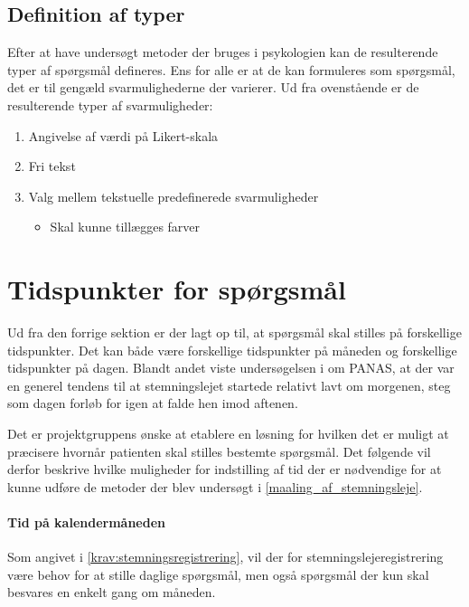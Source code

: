 \subsection{Definition af typer}\label{krav::typer}
Efter at have undersøgt metoder der bruges i psykologien kan de resulterende typer af spørgsmål defineres.
Ens for alle er at de kan formuleres som spørgsmål, det er til gengæld svarmulighederne der varierer.
Ud fra ovenstående er de resulterende typer af svarmuligheder:

\begin{enumerate}
\item Angivelse af værdi på Likert-skala
\item Fri tekst
\item Valg mellem tekstuelle predefinerede svarmuligheder
\begin{itemize}
	\item Skal kunne tillægges farver
\end{itemize}
\end{enumerate}

\section{Tidspunkter for spørgsmål}\label{tidspnkforspg}
Ud fra den forrige sektion er der lagt op til, at spørgsmål skal stilles på forskellige tidspunkter.
Det kan både være forskellige tidspunkter på måneden og forskellige tidspunkter på dagen.
Blandt andet viste undersøgelsen i \citet{panas} om PANAS, at der var en generel tendens til at stemningslejet startede relativt lavt om morgenen, steg som dagen forløb for igen at falde hen imod aftenen.

Det er projektgruppens ønske at etablere en løsning for hvilken det er muligt at præcisere hvornår patienten skal stilles bestemte spørgsmål.
Det følgende vil derfor beskrive hvilke muligheder for indstilling af tid der er nødvendige for at kunne udføre de metoder der blev undersøgt i \cref{maaling_af_stemningsleje}.

\paragraph{Tid på kalendermåneden}
Som angivet i \cref{krav:stemningsregistrering}, vil der for stemningslejeregistrering være behov for at stille daglige spørgsmål, men også spørgsmål der kun skal besvares en enkelt gang om måneden.

